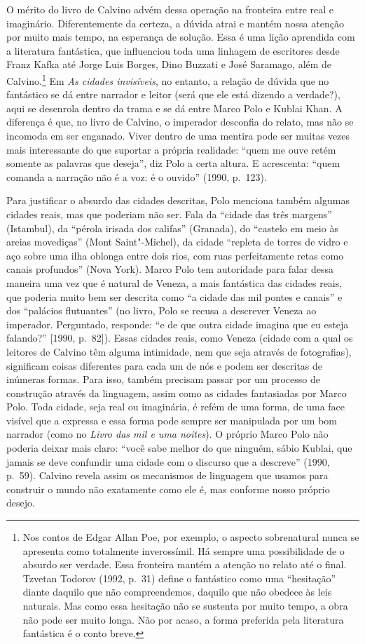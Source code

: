 O mérito do livro de Calvino advém dessa operação na fronteira entre
real e imaginário. Diferentemente da certeza, a dúvida atrai e mantém
nossa atenção por muito mais tempo, na esperança de solução. Essa é uma
lição aprendida com a literatura fantástica, que influenciou toda uma
linhagem de escritores desde Franz Kafka até Jorge Luis Borges, Dino
Buzzati e José Saramago, além de Calvino.\footnote{Nos contos de Edgar
  Allan Poe, por exemplo, o aspecto sobrenatural nunca se apresenta como
  totalmente inverossímil. Há sempre uma possibilidade de o absurdo ser
  verdade. Essa fronteira mantém a atenção no relato até o final.
  Tzvetan Todorov (1992, p.~31) define o fantástico como uma
  ``hesitação'' diante daquilo que não compreendemos, daquilo que não
  obedece às leis naturais. Mas como essa hesitação não se sustenta por
  muito tempo, a obra não pode ser muito longa. Não por acaso, a forma
  preferida pela literatura fantástica é o conto breve.} Em \emph{As
cidades invisíveis}, no entanto, a relação de dúvida que no fantástico
se dá entre narrador e leitor (será que ele está dizendo a verdade?),
aqui se desenrola dentro da trama e se dá entre Marco Polo e Kublai
Khan. A diferença é que, no livro de Calvino, o imperador desconfia do
relato, mas não se incomoda em ser enganado. Viver dentro de uma mentira
pode ser muitas vezes mais interessante do que suportar a própria
realidade: ``quem me ouve retém somente as palavras que deseja'', diz
Polo a certa altura. E acrescenta: ``quem comanda a narração não é a
voz: é o ouvido'' (1990, p.~123).

Para justificar o absurdo das cidades descritas, Polo menciona também
algumas cidades reais, mas que poderiam não ser. Fala da ``cidade das
três margens'' (Istambul), da ``pérola irisada dos califas'' (Granada),
do ``castelo em meio às areias movediças'' (Mont Saint"-Michel), da
cidade ``repleta de torres de vidro e aço sobre uma ilha oblonga entre
dois rios, com ruas perfeitamente retas como canais profundos'' (Nova
York). Marco Polo tem autoridade para falar dessa maneira uma vez que é
natural de Veneza, a mais fantástica das cidades reais, que poderia
muito bem ser descrita como ``a cidade das mil pontes e canais'' e dos
``palácios flutuantes'' (no livro, Polo se recusa a descrever Veneza ao
imperador. Perguntado, responde: ``e de que outra cidade imagina que eu
esteja falando?'' {[}1990, p.~82{]}). Essas cidades reais, como Veneza
(cidade com a qual os leitores de Calvino têm alguma intimidade, nem que
seja através de fotografias), significam coisas diferentes para cada um
de nós e podem ser descritas de inúmeras formas. Para isso, também
precisam passar por um processo de construção através da linguagem,
assim como as cidades fantasiadas por Marco Polo. Toda cidade, seja real
ou imaginária, é refém de uma forma, de uma face visível que a expressa
e essa forma pode sempre ser manipulada por um bom narrador (como no
\emph{Livro das mil e uma noites}). O próprio Marco Polo não poderia
deixar mais claro: ``você sabe melhor do que ninguém, sábio Kublai, que
jamais se deve confundir uma cidade com o discurso que a descreve''
(1990, p.~59). Calvino revela assim os mecanismos de linguagem que
usamos para construir o mundo não exatamente como ele é, mas conforme
nosso próprio desejo.

